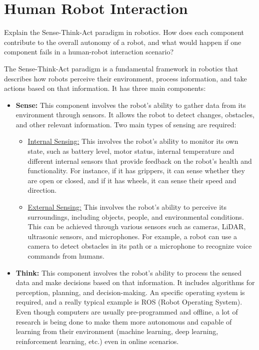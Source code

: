 \section{Human Robot Interaction}

\begin{ejercicio}
    Explain the Sense-Think-Act paradigm in robotics. How does each component contribute to the overall autonomy of a robot, and what would happen if one component fails in a human-robot interaction scenario?

    The Sense-Think-Act paradigm is a fundamental framework in robotics that describes how robots perceive their environment, process information, and take actions based on that information. It has three main components:
    \begin{itemize}
        \item \textbf{Sense:} This component involves the robot's ability to gather data from its environment through sensors. It allows the robot to detect changes, obstacles, and other relevant information. Two main types of sensing are required:
        \begin{itemize}
            \item \ul{Internal Sensing:} This involves the robot's ability to monitor its own state, such as battery level, motor status, internal temperature and different internal sensors that provide feedback on the robot's health and functionality. For instance, if it has grippers, it can sense whether they are open or closed, and if it has wheels, it can sense their speed and direction.
            \item \ul{External Sensing:} This involves the robot's ability to perceive its surroundings, including objects, people, and environmental conditions. This can be achieved through various sensors such as cameras, LiDAR, ultrasonic sensors, and microphones. For example, a robot can use a camera to detect obstacles in its path or a microphone to recognize voice commands from humans.
        \end{itemize}
        \item \textbf{Think:} This component involves the robot's ability to process the sensed data and make decisions based on that information. It includes algorithms for perception, planning, and decision-making. An specific operating system is required, and a really typical example is ROS (Robot Operating System). Even though computers are usually pre-programmed and offline, a lot of research is being done to make them more autonomous and capable of learning from their environment (machine learning, deep learning, reinforcement learning, etc.) even in online scenarios.
        

\end{itemize}
\end{ejercicio}
